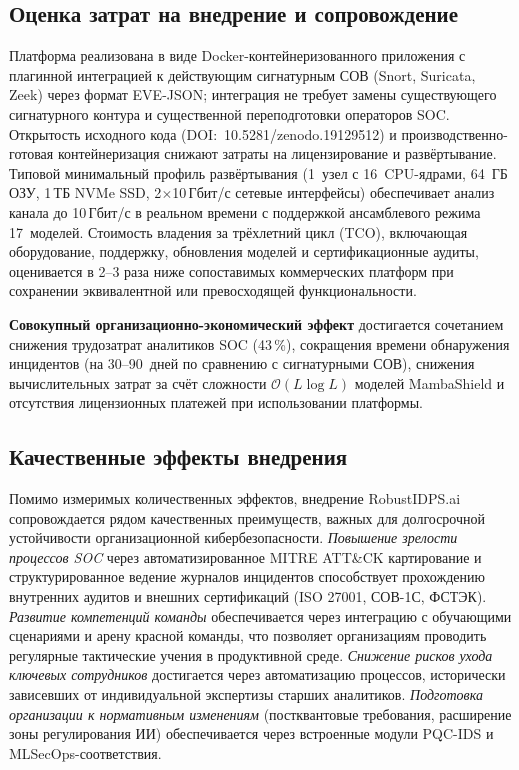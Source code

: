 \subsection{Оценка затрат на внедрение и сопровождение}

Платформа реализована в виде Docker-контейнеризованного приложения с
плагинной интеграцией к действующим сигнатурным СОВ (Snort, Suricata,
Zeek) через формат EVE-JSON; интеграция не требует замены существующего
сигнатурного контура и существенной переподготовки операторов SOC.
Открытость исходного кода (DOI:~10.5281/zenodo.19129512) и
производственно-готовая контейнеризация снижают затраты на
лицензирование и развёртывание. Типовой минимальный профиль
развёртывания (1~узел с 16~CPU-ядрами, 64~ГБ ОЗУ, 1\,ТБ NVMe SSD,
2$\times$10\,Гбит/с сетевые интерфейсы) обеспечивает анализ канала
до 10\,Гбит/с в реальном времени с поддержкой ансамблевого режима
17~моделей. Стоимость владения за трёхлетний цикл (TCO),
включающая оборудование, поддержку, обновления моделей и
сертификационные аудиты, оценивается в 2--3 раза ниже сопоставимых
коммерческих платформ при сохранении эквивалентной или превосходящей
функциональности.

\textbf{Совокупный организационно-экономический эффект} достигается
сочетанием снижения трудозатрат аналитиков SOC (43\,\%), сокращения
времени обнаружения инцидентов (на 30--90~дней по сравнению с
сигнатурными СОВ), снижения вычислительных затрат за счёт сложности
$\mathcal{O}(L\log L)$ моделей MambaShield и отсутствия лицензионных
платежей при использовании платформы.

\subsection{Качественные эффекты внедрения}

Помимо измеримых количественных эффектов, внедрение
\textsf{RobustIDPS.ai} сопровождается рядом качественных
преимуществ, важных для долгосрочной устойчивости организационной
кибербезопасности. \emph{Повышение зрелости процессов SOC} через
автоматизированное MITRE ATT\&CK картирование и структурированное
ведение журналов инцидентов способствует прохождению внутренних
аудитов и внешних сертификаций (ISO 27001, СОВ-1С, ФСТЭК).
\emph{Развитие компетенций команды} обеспечивается через интеграцию
с обучающими сценариями и арену красной команды, что позволяет
организациям проводить регулярные тактические учения в продуктивной
среде. \emph{Снижение рисков ухода ключевых сотрудников} достигается
через автоматизацию процессов, исторически зависевших от
индивидуальной экспертизы старших аналитиков. \emph{Подготовка
организации к нормативным изменениям} (постквантовые требования,
расширение зоны регулирования ИИ) обеспечивается через встроенные
модули PQC-IDS и MLSecOps-соответствия.

